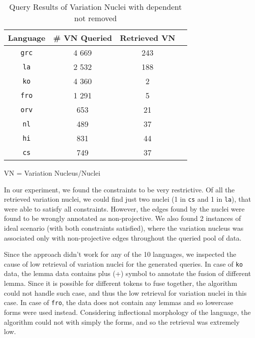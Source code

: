 \begin{table}[H]
    \centering
    \begin{tabular}{|c|c|c|c|}
    \hline
    \textbf{Language} & \textbf{\# VN Queried} & \textbf{Retrieved VN}\\
    \hline
    \texttt{grc} & 4 669 & 243\\
    \texttt{la} & 2 532 & 188 \\
    \texttt{ko} & 4 360 & 2 \\
    \texttt{fro} & 1 291 & 5 \\
    \texttt{orv} & 653 & 21 \\
    \texttt{nl} & 489 & 37 \\
    \texttt{hi} & 831 & 44 \\
    \texttt{cs} & 749 & 37 \\
    \hline
    \end{tabular}
    \caption{Query Results of Variation Nuclei with dependent not removed}VN = Variation Nucleus/Nuclei
    \label{tab:nucleiqueried1}
\end{table}

In our experiment, we found the constraints to be very restrictive. Of all the retrieved variation nuclei, we could find just two nuclei (1 in \verb|cs| and 1 in \verb|la|), that were able to satisfy all constraints. However, the edges found by the nuclei were found to be wrongly annotated as non-projective. We also found 2 instances of ideal scenario (with both constraints satisfied), where the variation nucleus was associated only with non-projective edges throughout the queried pool of data.

Since the approach didn't work for any of the 10 languages, we inspected the cause of low retrieval of variation nuclei for the generated queries. In case of \verb|ko| data, the lemma data contains plus (+) symbol to annotate the fusion of different lemma. Since it is possible for different tokens to fuse together, the algorithm could not handle such case, and thus the low retrieval for variation nuclei in this case. In case of \verb|fro|, the data does not contain any lemmas and so lowercase forms were used instead. Considering inflectional morphology of the language, the algorithm could not with simply the forms, and so the retrieval was extremely low.

